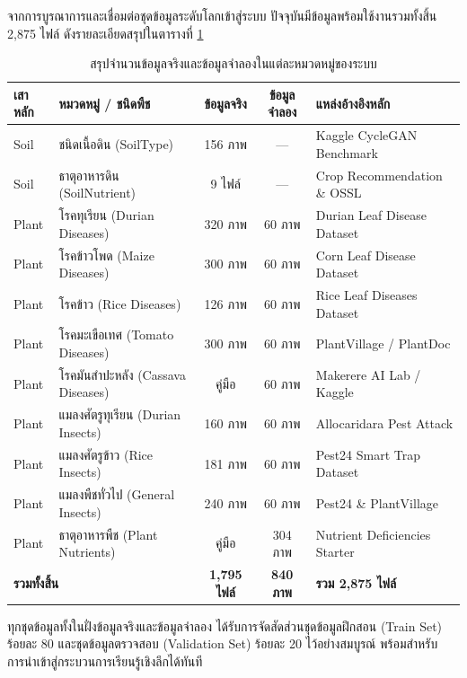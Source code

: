 \label{sec:dataset_statistics}

จากการบูรณาการและเชื่อมต่อชุดข้อมูลระดับโลกเข้าสู่ระบบ ปัจจุบันมีข้อมูลพร้อมใช้งานรวมทั้งสิ้น 2,875 ไฟล์ ดังรายละเอียดสรุปในตารางที่ \ref{tab:dataset_summary}

\begin{table}[htbp]
\caption{สรุปจำนวนข้อมูลจริงและข้อมูลจำลองในแต่ละหมวดหมู่ของระบบ}
\label{tab:dataset_summary}
\centering
\fontsize{9}{12}\selectfont
\begin{tabularx}{\textwidth}{llccX}
\toprule
\textbf{เสาหลัก} & \textbf{หมวดหมู่ / ชนิดพืช} & \textbf{ข้อมูลจริง} & \textbf{ข้อมูลจำลอง} & \textbf{แหล่งอ้างอิงหลัก} \\
\midrule
Soil & ชนิดเนื้อดิน (SoilType) & 156 ภาพ & --- & Kaggle CycleGAN Benchmark \\
Soil & ธาตุอาหารดิน (SoilNutrient) & 9 ไฟล์ & --- & Crop Recommendation \& OSSL \\
Plant & โรคทุเรียน (Durian Diseases) & 320 ภาพ & 60 ภาพ & Durian Leaf Disease Dataset \\
Plant & โรคข้าวโพด (Maize Diseases) & 300 ภาพ & 60 ภาพ & Corn Leaf Disease Dataset \\
Plant & โรคข้าว (Rice Diseases) & 126 ภาพ & 60 ภาพ & Rice Leaf Diseases Dataset \\
Plant & โรคมะเขือเทศ (Tomato Diseases) & 300 ภาพ & 60 ภาพ & PlantVillage / PlantDoc \\
Plant & โรคมันสำปะหลัง (Cassava Diseases) & คู่มือ & 60 ภาพ & Makerere AI Lab / Kaggle \\
Plant & แมลงศัตรูทุเรียน (Durian Insects) & 160 ภาพ & 60 ภาพ & Allocaridara Pest Attack \\
Plant & แมลงศัตรูข้าว (Rice Insects) & 181 ภาพ & 60 ภาพ & Pest24 Smart Trap Dataset \\
Plant & แมลงพืชทั่วไป (General Insects) & 240 ภาพ & 60 ภาพ & Pest24 \& PlantVillage \\
Plant & ธาตุอาหารพืช (Plant Nutrients) & คู่มือ & 304 ภาพ & Nutrient Deficiencies Starter \\
\midrule
\multicolumn{2}{l}{\textbf{รวมทั้งสิ้น}} & \textbf{1,795 ไฟล์} & \textbf{840 ภาพ} & \textbf{รวม 2,875 ไฟล์} \\
\bottomrule
\end{tabularx}
\end{table}

ทุกชุดข้อมูลทั้งในฝั่งข้อมูลจริงและข้อมูลจำลอง ได้รับการจัดสัดส่วนชุดข้อมูลฝึกสอน (Train Set) ร้อยละ 80 และชุดข้อมูลตรวจสอบ (Validation Set) ร้อยละ 20 ไว้อย่างสมบูรณ์ พร้อมสำหรับการนำเข้าสู่กระบวนการเรียนรู้เชิงลึกได้ทันที
